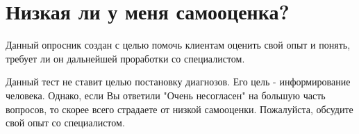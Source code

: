 \documentclass{../../shared/survey}
\begin{document}

\section*{\huge{Низкая ли у меня самооценка?}}

\begin{flushleft}
    Данный опросник создан с целью помочь клиентам оценить свой опыт и понять, требует ли он дальнейшей проработки со специалистом.
\end{flushleft}






\begin{flushleft}
Данный тест не ставит целью постановку диагнозов. Его цель - информирование человека. Однако, если Вы ответили "Очень несогласен" на большую часть вопросов, то скорее всего страдаете от низкой самооценки. Пожалуйста, обсудите свой опыт со специалистом.
\end{flushleft}
\end{document}
